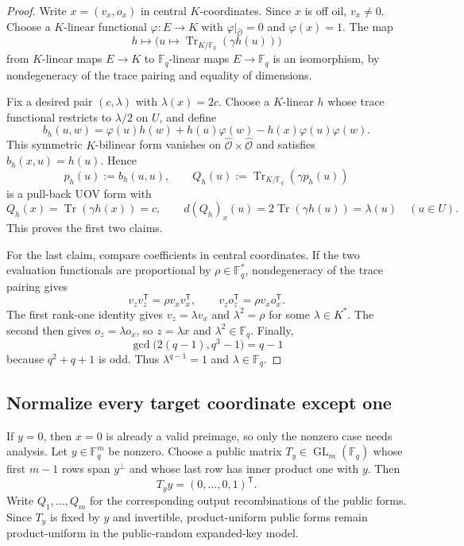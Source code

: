 \documentclass[11pt,a4paper]{article}
\theoremstyle{definition}
\theoremstyle{remark}
\newcommand{\F}{\mathbb F}
\newcommand{\cO}{\mathcal O}
\newcommand{\Tr}{\operatorname{Tr}}
\begin{document}
\begin{proof}
Write $x=(v_x,o_x)$ in central $K$-coordinates.  Since $x$ is off oil, $v_x\ne0$.  Choose a $K$-linear functional $\varphi:E\to K$ with
$\varphi|_{\widehat{\cO}}=0$ and $\varphi(x)=1$.  The map
\[
 h\longmapsto\bigl(u\mapsto\Tr_{K/\F_q}(\gamma h(u))\bigr)
\]
from $K$-linear maps $E\to K$ to $\F_q$-linear maps $E\to\F_q$ is an isomorphism, by nondegeneracy of the trace pairing and equality of dimensions.

Fix a desired pair $(c,\lambda)$ with $\lambda(x)=2c$.  Choose a $K$-linear $h$ whose trace functional restricts to $\lambda/2$ on $U$, and define
\[
 b_h(u,w)=\varphi(u)h(w)+h(u)\varphi(w)-h(x)\varphi(u)\varphi(w).
\]
This symmetric $K$-bilinear form vanishes on
$\widehat{\cO}\times\widehat{\cO}$ and satisfies $b_h(x,u)=h(u)$.  Hence
\[
 p_h(u):=b_h(u,u),
 \qquad
 Q_h(u):=\Tr_{K/\F_q}(\gamma p_h(u))
\]
is a pull-back UOV form with
\[
 Q_h(x)=\Tr(\gamma h(x))=c,
 \qquad
 d(Q_h)_x(u)=2\Tr(\gamma h(u))=\lambda(u)
 \quad(u\in U).
\]
This proves the first two claims.

For the last claim, compare coefficients in central coordinates.  If the two evaluation functionals are proportional by $\rho\in\F_q^*$, nondegeneracy of the trace pairing gives
\[
 v_zv_z^{\mathsf T}=\rho v_xv_x^{\mathsf T},
 \qquad
 v_zo_z^{\mathsf T}=\rho v_xo_x^{\mathsf T}.
\]
The first rank-one identity gives $v_z=\lambda v_x$ and $\lambda^2=\rho$ for some $\lambda\in K^*$.  The second then gives $o_z=\lambda o_x$, so $z=\lambda x$ and $\lambda^2\in\F_q$.  Finally,
\[
 \gcd\bigl(2(q-1),q^3-1\bigr)=q-1
\]
because $q^2+q+1$ is odd.  Thus $\lambda^{q-1}=1$ and $\lambda\in\F_q$.
\end{proof}

\subsection{Normalize every target coordinate except one}

If $y=0$, then $x=0$ is already a valid preimage, so only the nonzero case
needs analysis.  Let $y\in\F_q^m$ be nonzero.  Choose a public matrix
$T_y\in\operatorname{GL}_m(\F_q)$ whose first $m-1$ rows span $y^\perp$ and
whose last row has inner product one with $y$.  Then
\begin{equation}\label{eq:target-normalization}
 T_yy=(0,\ldots,0,1)^{\mathsf T}.
\end{equation}
Write $Q_1,\ldots,Q_m$ for the corresponding output recombinations of the
public forms.  Since $T_y$ is fixed by $y$ and invertible, product-uniform
public forms remain product-uniform in the public-random expanded-key model.
\end{document}
